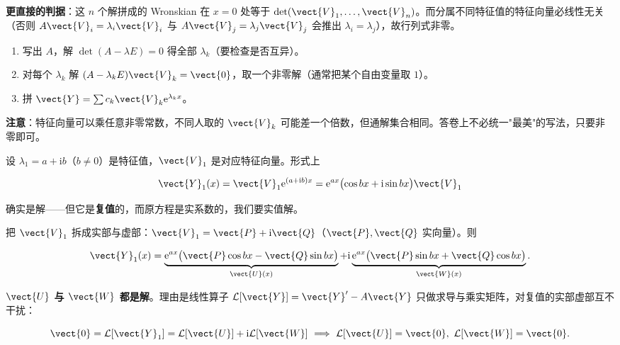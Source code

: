 \documentclass[11pt]{ctexart}
\begin{document}
\textbf{更直接的判据}：这 $n$ 个解拼成的 Wronskian 在 $x=0$ 处等于 $\det(\vect{V}_1,\dots,\vect{V}_n)$。而分属不同特征值的特征向量必线性无关（否则 $A\vect{V}_i=\lambda_i\vect{V}_i$ 与 $A\vect{V}_j=\lambda_j\vect{V}_j$ 会推出 $\lambda_i=\lambda_j$），故行列式非零。


\begin{enumerate}
  \item 写出 $A$，解 $\det(A-\lambda E)=0$ 得全部 $\lambda_k$（要检查是否互异）。
  \item 对每个 $\lambda_k$ 解 $(A-\lambda_kE)\vect{V}_k=\vect{0}$，取一个非零解（通常把某个自由变量取 $1$）。
  \item 拼 $\vect{Y}=\sum c_k\vect{V}_k\mathrm{e}^{\lambda_k x}$。
\end{enumerate}

\textbf{注意}：特征向量可以乘任意非零常数，不同人取的 $\vect{V}_k$ 可能差一个倍数，但通解集合相同。答卷上不必统一"最美"的写法，只要非零即可。



设 $\lambda_1=a+\mathrm{i}b$（$b\neq0$）是特征值，$\vect{V}_1$ 是对应特征向量。形式上

\[
\vect{Y}_1(x)=\vect{V}_1\mathrm{e}^{(a+\mathrm{i}b)x}
=\mathrm{e}^{ax}\bigl(\cos bx+\mathrm{i}\sin bx\bigr)\vect{V}_1
\]

确实是解——但它是\textbf{复值}的，而原方程是实系数的，我们要实值解。


把 $\vect{V}_1$ 拆成实部与虚部：$\vect{V}_1=\vect{P}+\mathrm{i}\vect{Q}$（$\vect{P},\vect{Q}$ 实向量）。则

\[
\vect{Y}_1(x)=\underbrace{\mathrm{e}^{ax}\bigl(\vect{P}\cos bx-\vect{Q}\sin bx\bigr)}_{\vect{U}(x)}
+\mathrm{i}\underbrace{\mathrm{e}^{ax}\bigl(\vect{P}\sin bx+\vect{Q}\cos bx\bigr)}_{\vect{W}(x)}.
\]

\textbf{$\vect{U}$ 与 $\vect{W}$ 都是解}。理由是线性算子 $\mathcal{L}[\vect{Y}]=\vect{Y}'-A\vect{Y}$ 只做求导与乘实矩阵，对复值的实部虚部互不干扰：

\[
\vect{0}=\mathcal{L}[\vect{Y}_1]=\mathcal{L}[\vect{U}]+\mathrm{i}\mathcal{L}[\vect{W}]
\ \Longrightarrow\ \mathcal{L}[\vect{U}]=\vect{0},\ \mathcal{L}[\vect{W}]=\vect{0}.
\]
\end{document}
